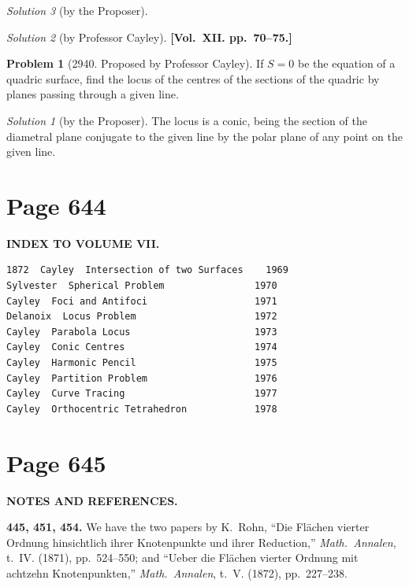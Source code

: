 \documentclass[12pt,a4paper]{article}
\theoremstyle{plain}
\theoremstyle{definition}
\newtheorem{problem}{Problem}
\theoremstyle{remark}
\newtheorem*{solution}{Solution}
\begin{document}
\begin{solution}[by the Proposer]
\begin{solution}[by Professor Cayley]
\medskip\noindent\textbf{[Vol.~XII. pp.~70--75.]}

\begin{problem}[2940. Proposed by Professor Cayley]
If $S = 0$ be the equation of a quadric surface, find the locus of the centres of the sections of the quadric by planes passing through a given line.
\end{problem}

\begin{solution}[by the Proposer]
The locus is a conic, being the section of the diametral plane conjugate to the given line by the polar plane of any point on the given line.
\end{solution}

\section*{Page 644}
\setcounter{page}{644}

\begin{center}
\textbf{INDEX TO VOLUME VII.}
\end{center}

\begin{verbatim}
1872  Cayley  Intersection of two Surfaces    1969
Sylvester  Spherical Problem                1970
Cayley  Foci and Antifoci                   1971
Delanoix  Locus Problem                     1972
Cayley  Parabola Locus                      1973
Cayley  Conic Centres                       1974
Cayley  Harmonic Pencil                     1975
Cayley  Partition Problem                   1976
Cayley  Curve Tracing                       1977
Cayley  Orthocentric Tetrahedron            1978
\end{verbatim}

\section*{Page 645}
\setcounter{page}{645}

\begin{center}
\textbf{NOTES AND REFERENCES.}
\end{center}

\noindent\textbf{445, 451, 454.} We have the two papers by K.~Rohn, ``Die Fl\"{a}chen vierter Ordnung hinsichtlich ihrer Knotenpunkte und ihrer Reduction,'' \textit{Math.~Annalen}, t.~IV. (1871), pp.~524--550; and ``Ueber die Fl\"{a}chen vierter Ordnung mit achtzehn Knotenpunkten,'' \textit{Math.~Annalen}, t.~V. (1872), pp.~227--238.


\end{solution}
\end{solution}
\end{document}

